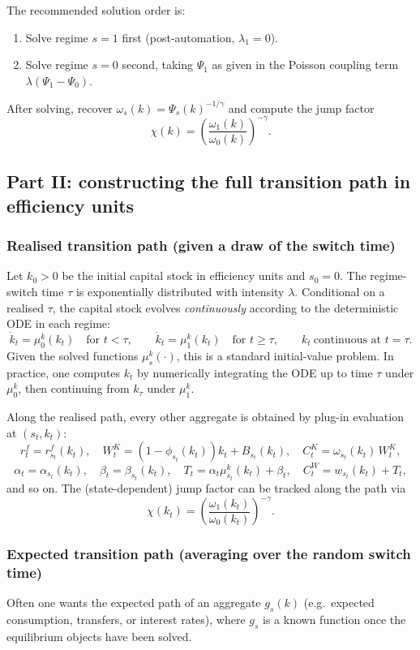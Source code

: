 \documentclass{article}
\begin{document}
The recommended solution order is:
\begin{enumerate}
\item Solve regime $s=1$ first (post-automation, $\lambda_1=0$).
\item Solve regime $s=0$ second, taking $\Psi_1$ as given in the Poisson coupling term $\lambda(\Psi_1-\Psi_0)$.
\end{enumerate}
After solving, recover $\omega_s(k)=\Psi_s(k)^{-1/\gamma}$ and compute the jump factor
\[
\chi(k)=\left(\frac{\omega_1(k)}{\omega_0(k)}\right)^{-\gamma}.
\]

\subsection{Part II: constructing the full transition path in efficiency units}

\subsubsection{Realised transition path (given a draw of the switch time)}
Let $k_0>0$ be the initial capital stock in efficiency units and $s_0=0$. The regime-switch time
$\tau$ is exponentially distributed with intensity $\lambda$. Conditional on a realised $\tau$, the
capital stock evolves \emph{continuously} according to the deterministic ODE in each regime:
\begin{equation}
\dot k_t = \mu^k_0(k_t)\quad \text{for } t<\tau,
\qquad
\dot k_t = \mu^k_1(k_t)\quad \text{for } t\ge \tau,
\qquad
k_t \ \text{continuous at } t=\tau.
\tag{59}
\end{equation}
Given the solved functions $\mu^k_s(\cdot)$, this is a standard initial-value problem. In practice,
one computes $k_t$ by numerically integrating the ODE up to time $\tau$ under $\mu^k_0$, then continuing
from $k_\tau$ under $\mu^k_1$.

Along the realised path, every other aggregate is obtained by plug-in evaluation at $(s_t,k_t)$:
\[
r^f_t = r^f_{s_t}(k_t),\quad
W^K_t = (1-\phi_{s_t}(k_t))k_t + B_{s_t}(k_t),\quad
C^K_t = \omega_{s_t}(k_t)\,W^K_t,
\]
\[
\alpha_t=\alpha_{s_t}(k_t),\quad \beta_t=\beta_{s_t}(k_t),\quad
T_t = \alpha_t \mu^k_{s_t}(k_t)+\beta_t,\quad
C^W_t = w_{s_t}(k_t)+T_t,
\]
and so on. The (state-dependent) jump factor can be tracked along the path via
\[
\chi(k_t)=\left(\frac{\omega_1(k_t)}{\omega_0(k_t)}\right)^{-\gamma}.
\]

\subsubsection{Expected transition path (averaging over the random switch time)}
Often one wants the expected path of an aggregate $g_{s}(k)$ (e.g.\ expected consumption, transfers,
or interest rates), where $g_s$ is a known function once the equilibrium objects have been solved.
\end{document}
